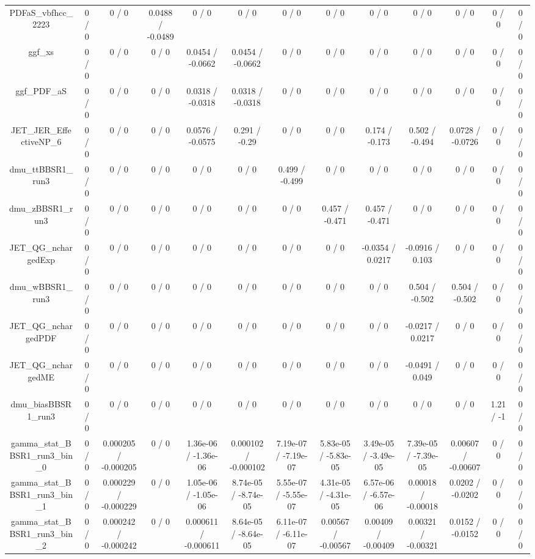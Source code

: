 \documentclass[10pt]{article}
\begin{document}
\begin{table}[htbp]
\begin{center}
\begin{tabular}{|c|c|c|c|c|c|c|c|c|c|c|c|c|}
  PDFaS_vbfhcc_2223 & 0 / 0 & 0 / 0 & 0.0488 / -0.0489 & 0 / 0 & 0 / 0 & 0 / 0 & 0 / 0 & 0 / 0 & 0 / 0 & 0 / 0 & 0 / 0 & 0 / 0 \\ 
  ggf_xs & 0 / 0 & 0 / 0 & 0 / 0 & 0.0454 / -0.0662 & 0.0454 / -0.0662 & 0 / 0 & 0 / 0 & 0 / 0 & 0 / 0 & 0 / 0 & 0 / 0 & 0 / 0 \\ 
  ggf_PDF_aS & 0 / 0 & 0 / 0 & 0 / 0 & 0.0318 / -0.0318 & 0.0318 / -0.0318 & 0 / 0 & 0 / 0 & 0 / 0 & 0 / 0 & 0 / 0 & 0 / 0 & 0 / 0 \\ 
  JET_JER_EffectiveNP_6 & 0 / 0 & 0 / 0 & 0 / 0 & 0.0576 / -0.0575 & 0.291 / -0.29 & 0 / 0 & 0 / 0 & 0.174 / -0.173 & 0.502 / -0.494 & 0.0728 / -0.0726 & 0 / 0 & 0 / 0 \\ 
  dmu_ttBBSR1_run3 & 0 / 0 & 0 / 0 & 0 / 0 & 0 / 0 & 0 / 0 & 0.499 / -0.499 & 0 / 0 & 0 / 0 & 0 / 0 & 0 / 0 & 0 / 0 & 0 / 0 \\ 
  dmu_zBBSR1_run3 & 0 / 0 & 0 / 0 & 0 / 0 & 0 / 0 & 0 / 0 & 0 / 0 & 0.457 / -0.471 & 0.457 / -0.471 & 0 / 0 & 0 / 0 & 0 / 0 & 0 / 0 \\ 
  JET_QG_nchargedExp & 0 / 0 & 0 / 0 & 0 / 0 & 0 / 0 & 0 / 0 & 0 / 0 & 0 / 0 & -0.0354 / 0.0217 & -0.0916 / 0.103 & 0 / 0 & 0 / 0 & 0 / 0 \\ 
  dmu_wBBSR1_run3 & 0 / 0 & 0 / 0 & 0 / 0 & 0 / 0 & 0 / 0 & 0 / 0 & 0 / 0 & 0 / 0 & 0.504 / -0.502 & 0.504 / -0.502 & 0 / 0 & 0 / 0 \\ 
  JET_QG_nchargedPDF & 0 / 0 & 0 / 0 & 0 / 0 & 0 / 0 & 0 / 0 & 0 / 0 & 0 / 0 & 0 / 0 & -0.0217 / 0.0217 & 0 / 0 & 0 / 0 & 0 / 0 \\ 
  JET_QG_nchargedME & 0 / 0 & 0 / 0 & 0 / 0 & 0 / 0 & 0 / 0 & 0 / 0 & 0 / 0 & 0 / 0 & -0.0491 / 0.049 & 0 / 0 & 0 / 0 & 0 / 0 \\ 
  dmu_biasBBSR1_run3 & 0 / 0 & 0 / 0 & 0 / 0 & 0 / 0 & 0 / 0 & 0 / 0 & 0 / 0 & 0 / 0 & 0 / 0 & 0 / 0 & 1.21 / -1 & 0 / 0 \\ 
  gamma_stat_BBSR1_run3_bin_0 & 0 / 0 & 0.000205 / -0.000205 & 0 / 0 & 1.36e-06 / -1.36e-06 & 0.000102 / -0.000102 & 7.19e-07 / -7.19e-07 & 5.83e-05 / -5.83e-05 & 3.49e-05 / -3.49e-05 & 7.39e-05 / -7.39e-05 & 0.00607 / -0.00607 & 0 / 0 & 0 / 0 \\ 
  gamma_stat_BBSR1_run3_bin_1 & 0 / 0 & 0.000229 / -0.000229 & 0 / 0 & 1.05e-06 / -1.05e-06 & 8.74e-05 / -8.74e-05 & 5.55e-07 / -5.55e-07 & 4.31e-05 / -4.31e-05 & 6.57e-06 / -6.57e-06 & 0.00018 / -0.00018 & 0.0202 / -0.0202 & 0 / 0 & 0 / 0 \\ 
  gamma_stat_BBSR1_run3_bin_2 & 0 / 0 & 0.000242 / -0.000242 & 0 / 0 & 0.000611 / -0.000611 & 8.64e-05 / -8.64e-05 & 6.11e-07 / -6.11e-07 & 0.00567 / -0.00567 & 0.00409 / -0.00409 & 0.00321 / -0.00321 & 0.0152 / -0.0152 & 0 / 0 & 0 / 0 \\ 

\end{tabular}
\end{center}
\end{table}
\end{document}
